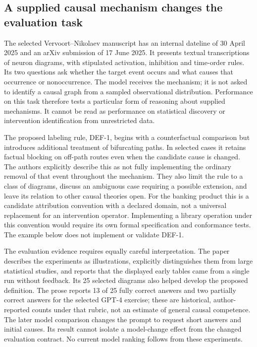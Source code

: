 \subsection{A supplied causal mechanism changes the evaluation task}
The selected Vervoort--Nikolaev manuscript has an internal dateline of
30 April 2025 and an arXiv submission of 17 June 2025. It presents textual
transcriptions of neuron diagrams, with stipulated activation, inhibition
and time-order rules. Its two questions ask whether the target event occurs
and what causes that occurrence or nonoccurrence. The model receives the
mechanism; it is not asked to identify a causal graph from a sampled
observational distribution. Performance on this task therefore tests a
particular form of reasoning about supplied mechanisms. It cannot be read as
performance on statistical discovery or intervention identification from
unrestricted data.~\citep{exec18_reasoning_neuron}

The proposed labeling rule, DEF-1, begins with a counterfactual comparison
but introduces additional treatment of bifurcating paths. In selected cases it
retains factual blocking on off-path routes even when the candidate cause is
changed. The authors explicitly describe this as not fully implementing the
ordinary removal of that event throughout the mechanism. They also limit
the rule to a class of diagrams, discuss an ambiguous case requiring a
possible extension, and leave its relation to other causal theories open.
For the banking product this is a candidate attribution convention with a
declared domain, not a universal replacement for an intervention operator.
Implementing a library operation under this convention would require its
own formal specification and conformance tests. The example below does not
implement or validate DEF-1.~\citep{exec18_reasoning_neuron}

The evaluation evidence requires equally careful interpretation. The paper
describes the experiments as illustrations, explicitly distinguishes them
from large statistical studies, and reports that the displayed early tables
came from a single run without feedback. Its 25 selected diagrams also
helped develop the proposed definition. The prose reports 13 of 25 fully
correct answers and two partially correct answers for the selected GPT-4
exercise; these are historical, author-reported counts under that rubric,
not an estimate of general causal competence. The later model comparison
changes the prompt to request short answers and initial causes. Its result
cannot isolate a model-change effect from the changed evaluation contract.
No current model ranking follows from these experiments.~\citep{exec18_reasoning_neuron}

